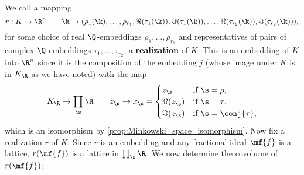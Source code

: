     We call a mapping
    \[
      r:K \to \R^{n} \qquad \k \to (\rho_{1}(\k),\ldots,\rho_{r_{1}},\Re(\tau_{1}(\k)),\Im(\tau_{1}(\k)),\ldots,\Re(\tau_{r_{2}}(\k)),\Im(\tau_{r_{2}}(\k))),
    \]
    for some choice of real $\Q$-embeddings $\rho_{1},\ldots,\rho_{r_{1}}$ and representatives of pairs of complex $\Q$-embeddings $\tau_{1},\ldots,\tau_{r_{2}}$, a \textbf{realization} of $K$. This is an embedding of $K$ into $\R^{n}$ since it is the composition of the embedding $j$ (whose image under $K$ is in $K_{\R}$ as we have noted) with the map
    \[
      K_{\R} \to \prod_{\s}\R \qquad z_{\s} \to x_{\s} = \begin{cases} z_{\s} & \text{if $\s = \rho$}, \\ \Re(z_{\s}) & \text{if $\s = \tau$}, \\ \Im(z_{\s}) & \text{if $\s = \conj{\tau}$}, \end{cases}
    \]
    which is an isomorphism by \cref{prop:Minkowski_space_isomorphism}. Now fix a realization $r$ of $K$. Since $r$ is an embedding and any fractional ideal $\mf{f}$ is a lattice, $r(\mf{f})$ is a lattice in $\prod_{\s}\R$. We now determine the covolume of $r(\mf{f})$:
    
